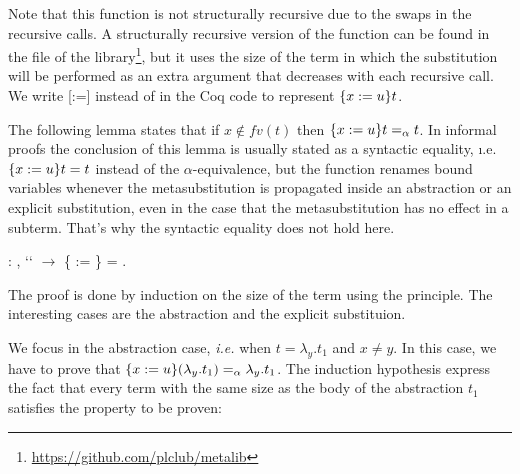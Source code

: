 Note that this function is not structurally recursive due to the swaps in the recursive calls. A structurally recursive version of the function  can be found in the file  of the  library\footnote{\url{https://github.com/plclub/metalib}}, but it uses the size of the term in which the substitution will be performed as an extra argument that decreases with each recursive call. We write [:=] instead of     in the Coq code to represent $\metasub{t}{x}{u}$.
\begin{coqdoccode}
\coqdocemptyline
\end{coqdoccode}
The following lemma states that if $x \notin fv(t)$ then $\metasub{t}{x}{u} =_\alpha t$. In informal proofs the conclusion of this lemma is usually stated as a syntactic equality, {\i.e.} $\metasub{t}{x}{u} = t$ instead of the $\alpha$-equivalence, but the function  renames bound variables whenever the metasubstitution is propagated inside an abstraction or an explicit substitution, even in the case that the metasubstitution has no effect in a subterm. That's why the syntactic equality does not hold here. 
\begin{coqdoccode}
\coqdocemptyline
\coqdocnoindent
{} : \coqdockw{\ensuremath{\forall}}   ,  ``   \ensuremath{\rightarrow} \{ := \} = .\coqdoceol
\end{coqdoccode}
 The proof is done by induction on the size of the term  using the  principle. The interesting cases are the abstraction and the explicit substituion.
\begin{coqdoccode}
\end{coqdoccode}
We focus in the abstraction case, {\it i.e.} when $t = \lambda_y.t_1$ and $x \neq y$. In this case, we have to prove that $\metasub{(\lambda_y.t_1)}{x}{u} =_\alpha \lambda_y.t_1$. The induction hypothesis express the fact that every term with the same size as the body of the abstraction $t_1$ satisfies the property to be proven:


